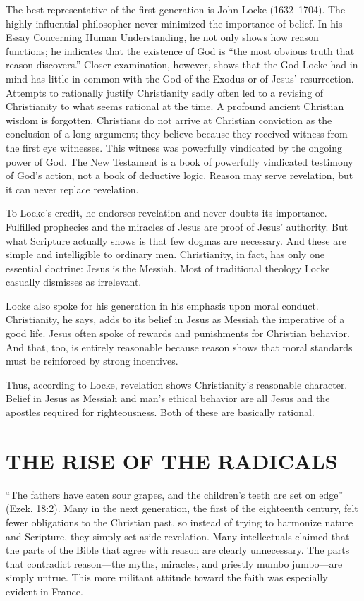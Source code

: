 The best representative of the first generation is John Locke (1632–1704). The highly influential
philosopher never minimized the importance of belief. In his Essay Concerning Human Understanding,
he not only shows how reason functions; he indicates that the existence of God is “the most obvious
truth that reason discovers.” Closer examination, however, shows that the God Locke had in mind has
little in common with the God of the Exodus or of Jesus’ resurrection. Attempts to rationally
justify Christianity sadly often led to a revising of Christianity to what seems rational at the
time. A profound ancient Christian wisdom is forgotten. Christians do not arrive at Christian
conviction as the conclusion of a long argument; they believe because they received witness from the
first eye witnesses. This witness was powerfully vindicated by the ongoing power of God. The New
Testament is a book of powerfully vindicated testimony of God’s action, not a book of deductive
logic. Reason may serve revelation, but it can never replace revelation.

To Locke’s credit, he endorses revelation and never doubts its importance. Fulfilled prophecies and
the miracles of Jesus are proof of Jesus’ authority. But what Scripture actually shows is that few
dogmas are necessary. And these are simple and intelligible to ordinary men. Christianity, in fact,
has only one essential doctrine: Jesus is the Messiah. Most of traditional theology Locke casually
dismisses as irrelevant.

Locke also spoke for his generation in his emphasis upon moral conduct. Christianity, he says, adds
to its belief in Jesus as Messiah the imperative of a good life. Jesus often spoke of rewards and
punishments for Christian behavior. And that, too, is entirely reasonable because reason shows that
moral standards must be reinforced by strong incentives.

Thus, according to Locke, revelation shows Christianity’s reasonable character. Belief in Jesus as
Messiah and man’s ethical behavior are all Jesus and the apostles required for righteousness. Both
of these are basically rational.

\section{THE RISE OF THE RADICALS}

“The fathers have eaten sour grapes, and the children’s teeth are set on edge” (Ezek. 18:2). Many in
the next generation, the first of the eighteenth century, felt fewer obligations to the Christian
past, so instead of trying to harmonize nature and Scripture, they simply set aside revelation. Many
intellectuals claimed that the parts of the Bible that agree with reason are clearly unnecessary.
The parts that contradict reason—the myths, miracles, and priestly mumbo jumbo—are simply untrue.
This more militant attitude toward the faith was especially evident in France.

